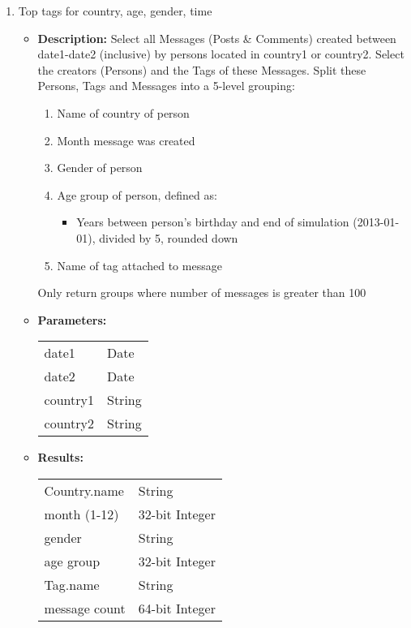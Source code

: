 {\begin{enumerate}
      \item Top tags for country, age, gender, time
            \begin{itemize}
                \item \textbf{Description:}
                  Select all Messages (Posts \& Comments) created between date1-date2 (inclusive) by persons located in country1 or country2.
                  Select the creators (Persons) and the Tags of these Messages.
                  Split these Persons, Tags and Messages into a 5-level grouping:
                  \begin{enumerate}
                    \item Name of country of person
                    \item Month message was created
                    \item Gender of person
                    \item Age group of person, defined as:
                      \begin{itemize}
                        \item Years between person's birthday and end of simulation (2013-01-01), divided by 5, rounded down
                      \end{itemize}
                    \item Name of tag attached to message
                  \end{enumerate}
                  Only return groups where number of messages is greater than 100

                \item \textbf{Parameters:} \\
                    \begin{tabular}{ll}
                      date1 & Date \\
                      date2 & Date \\
                      country1 & String \\
                      country2 & String \\
                    \end{tabular}
                \item \textbf{Results:} \\
                    \begin{tabular}{ll}
                      Country.name & String \\
                      month (1-12) & 32-bit Integer \\
                      gender & String \\
                      age group & 32-bit Integer \\
                      Tag.name & String \\
                      message count & 64-bit Integer \\
                    \end{tabular}


\end{itemize}
\end{enumerate}}
